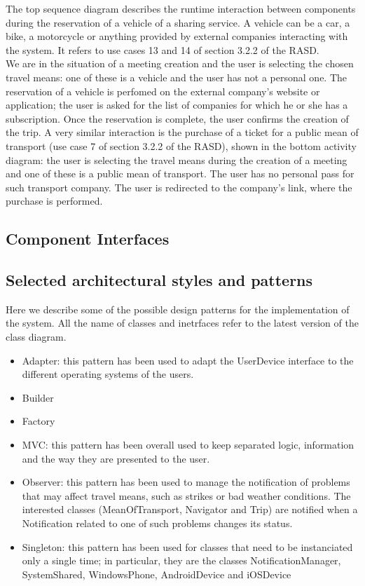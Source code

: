 \documentclass[a4paper,leqno]{article}
\begin{document}
The top sequence diagram describes the runtime interaction between components during the reservation of a vehicle of a sharing service. A vehicle can be a car, a bike, a 
motorcycle or anything provided by external companies interacting with the system. It refers to use cases 13 and 14 of section 3.2.2 of the RASD.\\
We are in the situation of a meeting creation and the user is selecting the chosen travel means: one of these is a vehicle and the user has not a personal one.
The reservation of a vehicle is perfomed on the external company's website or application; the user is asked for the list of companies for which he or she has a subscription.
Once the reservation is complete, the user confirms the creation of the trip.
A very similar interaction is the purchase of a ticket for a public mean of transport (use case 7 of section 3.2.2 of the RASD), shown in the bottom activity diagram: the user is selecting the travel means during the creation of a meeting and
one of these is a public mean of transport. The user has no personal pass for such transport company. The user is redirected to the company's link, where the purchase
is performed.

\subsection{Component Interfaces}
\subsection{Selected architectural styles and patterns}
Here we describe some of the possible design patterns for the implementation of the system. All the name of classes and inetrfaces refer to the latest version of the class diagram.
\begin{itemize}
	\item Adapter: this pattern has been used to adapt the UserDevice interface to the different operating systems of the users.
	\item Builder
	\item Factory
	\item MVC: this pattern has been overall used to keep separated logic, information and the way they are presented to the user.
	\item Observer: this pattern has been used to manage the notification of problems that may affect travel means, such as strikes or bad weather conditions. The interested classes (MeanOfTransport, Navigator and Trip) are notified when a Notification related to one of such problems changes its status.
	\item Singleton: this pattern has been used for classes that need to be instanciated only a single time; in particular, they are the classes NotificationManager, SystemShared, WindowsPhone, AndroidDevice and iOSDevice
\end{itemize}
\end{document}
